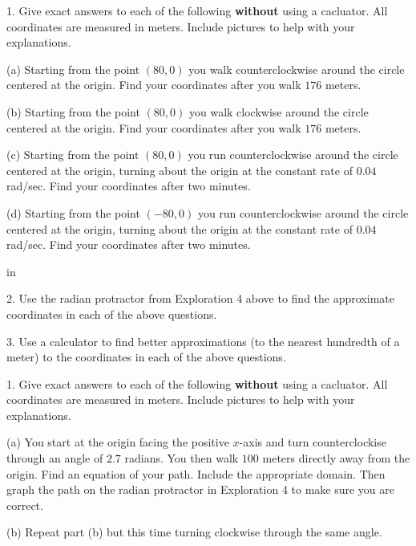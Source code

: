 \documentclass{ximera}
\newcommand{\pskip}{\vskip 0.1 in}
\begin{document}
\begin{question}  \label{Q2354234:Cosine}
1. Give exact answers to each of the following {\bf without} using a cacluator. All coordinates are measured in meters. Include pictures to help with your explanations.

(a) Starting from the point $(80,0)$ you walk counterclockwise around the circle centered at the origin. Find your coordinates after you walk $176$ meters.

(b) Starting from the point $(80,0)$ you walk clockwise around the circle centered at the origin. Find your coordinates after you walk $176$ meters.

(c)  Starting from the point $(80,0)$ you run counterclockwise around the circle centered at the origin, turning about the origin at the constant rate of $0.04$ rad/sec. Find your coordinates after two minutes.

(d) Starting from the point $(-80,0)$ you run counterclockwise around the circle centered at the origin, turning about the origin at the constant rate of $0.04$ rad/sec. Find your coordinates after two minutes.

\pskip

2. Use the radian protractor from Exploration 4 above to find the approximate coordinates in each of the above questions.

3. Use a calculator to find better approximations (to the nearest hundredth of a meter) to the coordinates in each of the above questions.


\end{question}



\begin{question}  \label{Qsdg53:Cosine}
1. Give exact answers to each of the following {\bf without} using a cacluator. All coordinates are measured in meters. Include pictures to help with your explanations.

(a) You start at the origin facing the positive $x$-axis and turn counterclockise through an angle of $2.7$ radians. You then walk $100$ meters directly away from the origin. Find an equation of your path. Include the appropriate domain. Then graph the path on the radian protractor in Exploration 4 to make sure you are correct.

(b) Repeat part (b) but this time turning clockwise through the same angle. 


\end{question}
\end{document}
